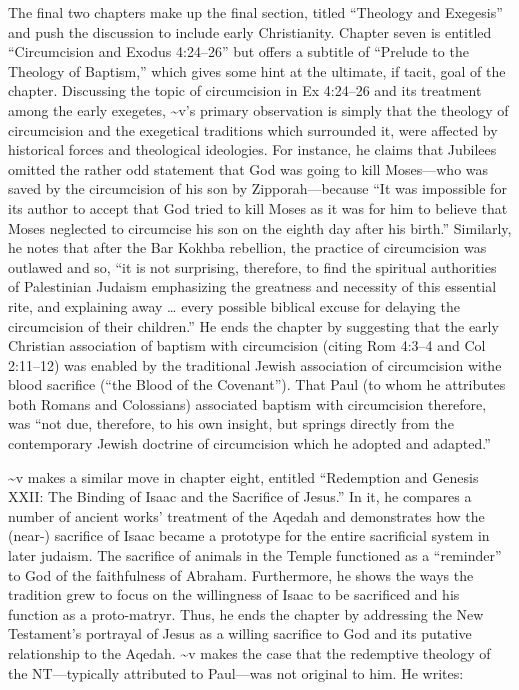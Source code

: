 The final two chapters make up the final section, titled ``Theology and
Exegesis'' and push the discussion to include early Christianity.
Chapter seven is entitled ``Circumcision and Exodus 4:24--26'' but
offers a subtitle of ``Prelude to the Theology of Baptism,'' which gives
some hint at the ultimate, if tacit, goal of the chapter. Discussing the
topic of circumcision in Ex 4:24--26 and its treatment among the early
exegetes, \textasciitilde{}v's primary observation is simply that the
theology of circumcision and the exegetical traditions which surrounded
it, were affected by historical forces and theological ideologies. For
instance, he claims that Jubilees omitted the rather odd statement that
God was going to kill Moses---who was saved by the circumcision of his
son by Zipporah---because ``It was impossible for its author to accept
that God tried to kill Moses as it was for him to believe that Moses
neglected to circumcise his son on the eighth day after his
birth.''\autocite[185]{vermes1961} Similarly, he notes that after the
Bar Kokhba rebellion, the practice of circumcision was outlawed and so,
``it is not surprising, therefore, to find the spiritual authorities of
Palestinian Judaism emphasizing the greatness and necessity of this
essential rite, and explaining away \ldots{} every possible biblical
excuse for delaying the circumcision of their
children.''\autocite[189]{vermes1961} He ends the chapter by suggesting
that the early Christian association of baptism with circumcision
(citing Rom 4:3--4 and Col 2:11--12) was enabled by the traditional
Jewish association of circumcision withe blood sacrifice (``the Blood of
the Covenant'')\autocite[190]{vermes1961}. That Paul (to whom he
attributes both Romans and Colossians) associated baptism with
circumcision therefore, was ``not due, therefore, to his own insight,
but springs directly from the contemporary Jewish doctrine of
circumcision which he adopted and adapted.''\autocite[191]{vermes1961}

\textasciitilde{}v makes a similar move in chapter eight, entitled
``Redemption and Genesis XXII: The Binding of Isaac and the Sacrifice of
Jesus.'' In it, he compares a number of ancient works' treatment of the
Aqedah and demonstrates how the (near-) sacrifice of Isaac became a
prototype for the entire sacrificial system in later judaism. The
sacrifice of animals in the Temple functioned as a ``reminder'' to God
of the faithfulness of Abraham. Furthermore, he shows the ways the
tradition grew to focus on the willingness of Isaac to be sacrificed and
his function as a proto-matryr. Thus, he ends the chapter by addressing
the New Testament's portrayal of Jesus as a willing sacrifice to God and
its putative relationship to the Aqedah. \textasciitilde{}v makes the
case that the redemptive theology of the NT---typically attributed to
Paul---was not original to him. He writes:

